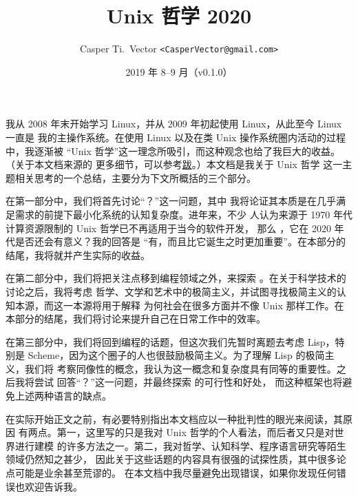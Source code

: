 \documentclass[UTF8]{ctexart}
\begin{document}
\title{\textbf{Unix 哲学 2020}}
\author{Casper Ti.\ Vector \texttt{<CasperVector@gmail.com>}}
\date{2019 年 8--9 月（v0.1.0）}
\maketitle
\vspace{\baselineskip}
\tableofcontents


我从 2008 年末开始学习 Linux，并从 2009 年初起使用 Linux，从此至今 Linux 一直是
我的主操作系统。在使用 Linux 以及在类 Unix 操作系统圈内活动的过程中，我逐渐被
“Unix 哲学”这一理念所吸引，而这种观念也给了我巨大的收益。（关于本文档来源的
更多细节，可以参考\hyperref[sec:afterword]{跋}。）本文档是我关于 Unix 哲学
这一主题相关思考的一个总结，主要分为下文所概括的三个部分。

在第一部分中，我们将首先讨论“？”这一问题，其中
我将论证其本质是在几乎满足需求的前提下最小化系统的认知复杂度。进年来，不少
人认为来源于 1970 年代计算资源限制的 Unix 哲学已不再适用于当今的软件开发，
那么 ，它在 2020 年代是否还会有意义？我的回答是
“有，而且比它诞生之时更加重要”。在本部分的结尾，我将就并产生实际的收益。

在第二部分中，我们将把关注点移到编程领域之外，来探索 。在关于科学技术的讨论之后，我将考虑
哲学、文学和艺术中的极简主义，并试图寻找极简主义的认知本源，而这一本源将用于解释
为何社会在很多方面并不像 Unix 那样工作。在本部分的结尾，我们将讨论来提升自己在日常工作中的效率。

在第三部分中，我们将回到编程的话题，但这次我们先暂时离题去考虑 Lisp，特别是
Scheme，因为这个圈子的人也很鼓励极简主义。为了理解 Lisp 的极简主义，我们将
考察同像性的概念，我认为这一概念和复杂度具有同等的重要性。之后我将尝试
回答“？”这一问题，并最终探索%
的可行性和好处，
而这种框架也将避免上述两种语言的缺点。

在实际开始正文之前，有必要特别指出本文档应以一种批判性的眼光来阅读，其原因
有两点。第一，这里写的只是我对 Unix 哲学的个人看法，而后者又只是对世界进行建模
的许多方法之一。第二，我对哲学、认知科学、程序语言研究等陌生领域仍然知之甚少，
因此关于这些话题的内容具有很强的试探性质，其中很多论点可能是业余甚至荒谬的。
在本文档中我尽量避免出现错误，如果你发现任何错误也欢迎告诉我。
\end{document}
